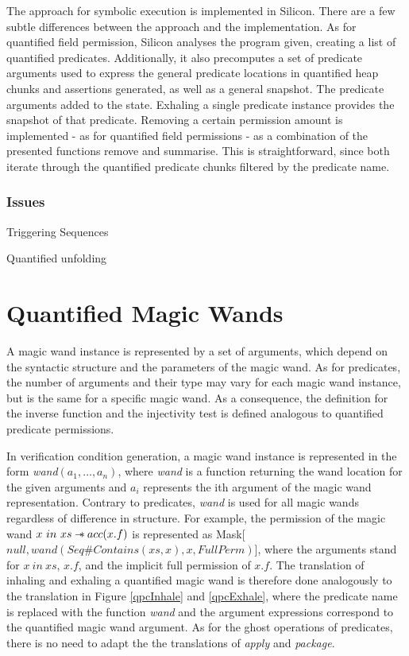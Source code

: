 \documentclass[12pt]{article}
\begin{document}
The approach for symbolic execution is implemented in Silicon. There are a few subtle differences between the approach and the implementation. As for quantified field permission, Silicon analyses the program given, creating a list of quantified predicates. Additionally, it also precomputes a set of predicate arguments used to express the general predicate locations in quantified heap chunks and assertions generated, as well as a general snapshot. The predicate arguments added to the state.
Exhaling a single predicate instance provides the snapshot of that predicate. Removing a certain permission amount is implemented - as for quantified field permissions - as a combination of the presented functions remove and summarise. This is straightforward, since both iterate through the quantified predicate chunks filtered by the predicate name.

\subsubsection{Issues}
Triggering Sequences

Quantified unfolding

\section{Quantified Magic Wands}
\label{qmw}
A magic wand instance is represented by a set of arguments, which depend on the syntactic structure and the parameters of the magic wand. As for predicates, the number of arguments and their type may vary for each magic wand instance, but is the same for a specific magic wand. As a consequence, the definition for the inverse function and the injectivity test is defined analogous to quantified predicate permissions.

In verification condition generation, a magic wand instance is represented in the form \textit{wand}\((a_1, \dots, a_n)\), where \textit{wand} is a function returning the wand location for the given arguments and \(a_i\) represents the ith argument of the magic wand representation. Contrary to predicates, \textit{wand} is used for all magic wands regardless of difference in structure. For example, the permission of the magic wand \(x\ in\ xs \mathbin{-\!\!*} acc(x.f)\) is represented as Mask[\(null, wand(Seq\#Contains(xs, x), x, FullPerm)\)], where the arguments stand for \(x\ in\ xs\), \(x.f\), and the implicit full permission of \(x.f\).
The translation of inhaling and exhaling a quantified magic wand is therefore done analogously to the translation in Figure \ref{qpcInhale} and \ref{qpcExhale}, where the predicate name is replaced with the function \textit{wand} and the argument expressions correspond to the quantified magic wand argument. As for the ghost operations of predicates, there is no need to adapt the the translations of \textit{apply} and \textit{package}.
\end{document}
